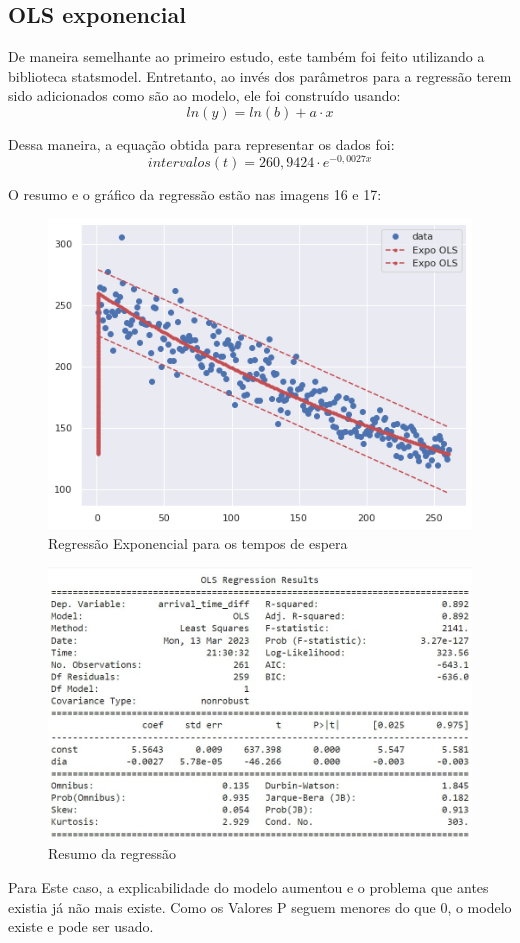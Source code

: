 \subsection{OLS exponencial}

De maneira semelhante ao primeiro estudo, este também foi feito utilizando a biblioteca statsmodel. Entretanto, ao invés dos parâmetros para a regressão terem sido adicionados como são ao modelo, ele foi construído usando: $$ln(y) = ln(b) + a \cdot x$$

Dessa maneira, a equação obtida para representar os dados foi:
$$intervalos(t) = 260,9424 \cdot e^{-0,0027x} $$

O resumo e o gráfico da regressão estão nas imagens 16 e 17:
\begin{figure}[H]
    \includegraphics{analise-de-dados/regressao/regressao_EXPO.png}
    \caption{Regressão Exponencial para os tempos de espera}
    \label{fig: plot_Expo_OLS}
\end{figure}

\begin{figure}[H]
    \includegraphics[scale = 0.85]{analise-de-dados/regressao/EXPO_OLS_Summary.jpg}
    \caption{Resumo da regressão}
    \label{fig: sum_Expo_OLS}
\end{figure}

Para Este caso, a explicabilidade do modelo aumentou e o problema que antes existia já não mais existe. Como os Valores P seguem menores do que 0, o modelo existe e pode ser usado.
